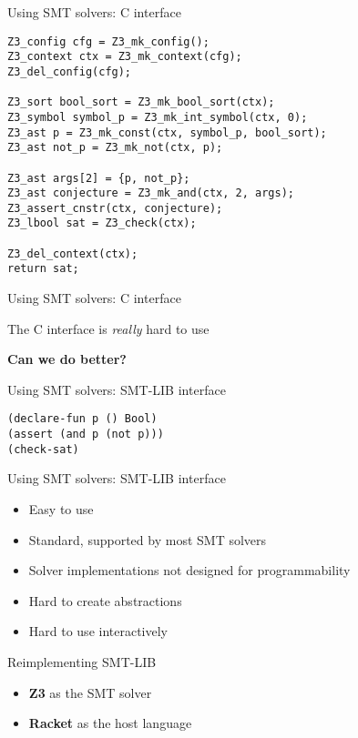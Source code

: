 \documentclass{beamer}
\begin{document}
\begin{frame}[fragile]{Using SMT solvers: C interface}
\begin{verbatim}
Z3_config cfg = Z3_mk_config();
Z3_context ctx = Z3_mk_context(cfg);
Z3_del_config(cfg);

Z3_sort bool_sort = Z3_mk_bool_sort(ctx);
Z3_symbol symbol_p = Z3_mk_int_symbol(ctx, 0);
Z3_ast p = Z3_mk_const(ctx, symbol_p, bool_sort);
Z3_ast not_p = Z3_mk_not(ctx, p);

Z3_ast args[2] = {p, not_p};
Z3_ast conjecture = Z3_mk_and(ctx, 2, args);
Z3_assert_cnstr(ctx, conjecture);
Z3_lbool sat = Z3_check(ctx);

Z3_del_context(ctx);
return sat;
\end{verbatim}

\end{frame}

\begin{frame}{Using SMT solvers: C interface}
\begin{center}
The C interface is \textit{really} hard to use

\pause
\textbf{Can we do better?}
\end{center}
\end{frame}

\begin{frame}[fragile]{Using SMT solvers: SMT-LIB interface}
\begin{verbatim}
(declare-fun p () Bool)
(assert (and p (not p)))
(check-sat)
\end{verbatim}
\end{frame}

\begin{frame}{Using SMT solvers: SMT-LIB interface}
\begin{itemize}
\item Easy to use
\item Standard, supported by most SMT solvers
\pause
\item Solver implementations not designed for programmability
\pause
\item Hard to create abstractions
\item Hard to use interactively
\end{itemize}
\end{frame}

\begin{frame}{Reimplementing SMT-LIB}
\begin{itemize}
\item \textbf{Z3} as the SMT solver
\pause
\item \textbf{Racket} as the host language
\end{itemize}
\end{frame}
\end{document}
